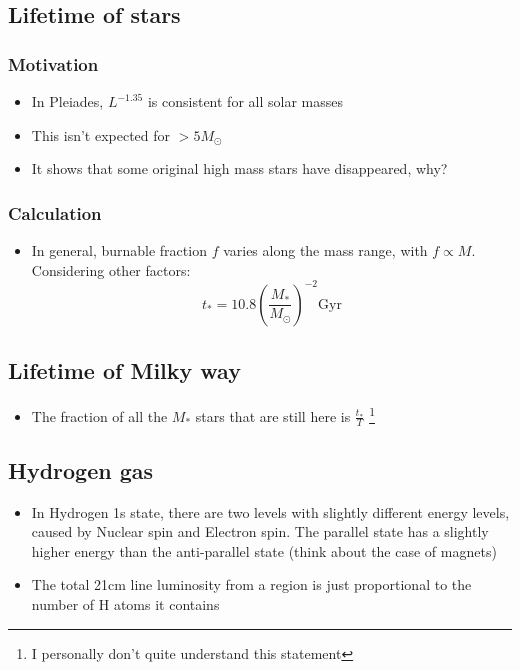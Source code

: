 \documentclass{article}
\begin{document}
\subsection{Lifetime of stars}
\subsubsection{Motivation}
\begin{itemize}
\item In Pleiades, $L^{-1.35}$ is consistent for all solar masses
\item This isn't expected for $> 5 M_\odot$
\item It shows that some original high mass stars have disappeared, why?
\end{itemize}
\subsubsection{Calculation}
\begin{itemize}
\item In general, burnable fraction $f$ varies along the mass range, with $f \propto M$. Considering other factors:
\begin{equation}
t_*=10.8 \left(\frac{M_*}{M_\odot} \right)^{-2} \text{Gyr}
\end{equation}
\end{itemize}
\subsection{Lifetime of Milky way}
\begin{itemize}
\item The fraction of all the $M_*$ stars that are still here is $\frac{t_*}{T}$ \footnote{I personally don't quite understand this statement}
\end{itemize}
\subsection{Hydrogen gas}
\begin{itemize}
\item In Hydrogen 1s state, there are two levels with slightly different energy levels, caused by Nuclear spin and Electron spin. The parallel state has a slightly higher energy than the anti-parallel state (think about the case of magnets)
\item The total 21cm line luminosity from a region is just proportional to the number of H atoms it contains 
\end{itemize}
\end{document}
